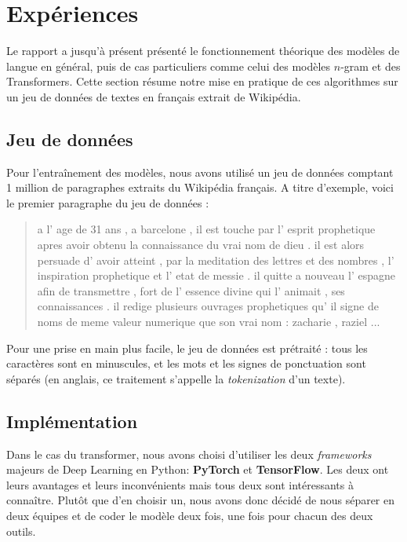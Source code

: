 \hypertarget{expuxe9riences}{%
\section{Expériences}\label{expuxe9riences}}

Le rapport a jusqu'à présent présenté le fonctionnement théorique des
modèles de langue en général, puis de cas particuliers comme celui des
modèles $n$-gram et des Transformers. Cette section résume notre mise en
pratique de ces algorithmes sur un jeu de données de textes en français extrait de
Wikipédia.

\hypertarget{jeu-de-donnuxe9es}{%
\subsection{Jeu de données}\label{jeu-de-donnuxe9es}}

Pour l'entraînement des modèles, nous avons utilisé un jeu de données
comptant 1 million de paragraphes extraits du Wikipédia français. A
titre d'exemple, voici le premier paragraphe du jeu de données :

\begin{quotation}
a l' age de 31 ans , a barcelone , il est touche par l' esprit prophetique apres avoir obtenu la connaissance du vrai nom de dieu . il est alors persuade d' avoir atteint , par la meditation des lettres et des nombres , l' inspiration prophetique et l' etat de messie . il quitte a nouveau l' espagne afin de transmettre , fort de l' essence divine qui l' animait , ses connaissances . il redige plusieurs ouvrages prophetiques qu' il signe de noms de meme valeur numerique que son vrai nom : zacharie , raziel ...
\end{quotation}

Pour une prise en main plus facile, le jeu de données est prétraité :
tous les caractères sont en minuscules, et les mots et les signes de
ponctuation sont séparés (en anglais, ce traitement s'appelle la
\textit{tokenization} d'un texte).


\subsection{Implémentation}

Dans le cas du transformer, nous avons choisi d'utiliser les deux
\textit{frameworks} majeurs de Deep Learning en Python: \textbf{PyTorch}
et \textbf{TensorFlow}. Les deux ont leurs avantages et leurs inconvénients
mais tous deux sont intéressants à connaître. Plutôt que d’en choisir un,
nous avons donc décidé de nous séparer en deux équipes et de coder le
modèle deux fois, une fois pour chacun des deux outils.



